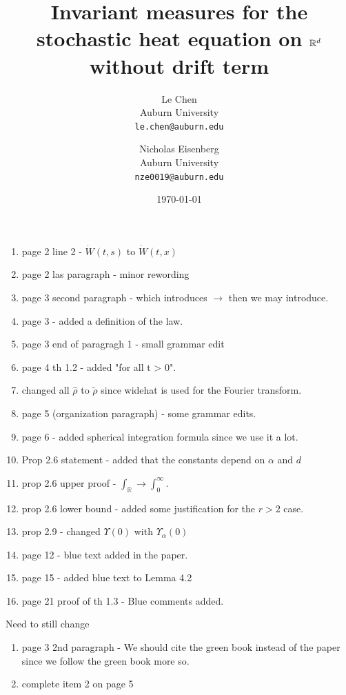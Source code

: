 \documentclass[a4paper,11pt]{article}%
\title{Invariant measures for the stochastic heat equation on $\R^d$ without drift term}
\author{Le Chen\\Auburn University\\\texttt{le.chen@auburn.edu}\\
  \and
    Nicholas Eisenberg\\Auburn University\\\texttt{nze0019@auburn.edu}
  }
\date{\today}
\theoremstyle{plain}
\theoremstyle{definition}
\numberwithin{equation}{section}
\newcommand{\R}{\mathbb{R}}
\begin{document}
	\begin{enumerate}
		\item page 2 line 2 - $\dot{W}(t,s)$ to $\dot{W}(t,x)$
		\item page 2 las paragraph - minor rewording 
		\item page 3 second paragraph - which introduces $\to$ then we may introduce.
		\item page 3 - added a definition of the law.
		\item page 3 end of paragragh 1 - small grammar edit
		\item page 4 th 1.2 - added "for all t > 0".
    	\item changed all $\widehat{\rho}$ to $\tilde\rho$ since widehat is used for the Fourier transform.
    	\item page 5 (organization paragraph) - some grammar edits.
    	\item page 6 - added spherical integration formula since we use it a lot. 
    	\item Prop 2.6 statement - added that the constants depend on $\alpha$ and $d$
    	\item prop 2.6 upper proof - $\int_{\R} \to \int_0^{\infty}$. 
    	\item prop 2.6 lower bound - added some justification for the $r > 2$ case. 
    	\item prop 2.9 - changed $\Upsilon(0)$ with $\Upsilon_{\alpha}(0)$
    	\item page 12 - blue text added in the paper.
    	\item page 15 - added blue text to Lemma 4.2
    	\item page 21 proof of th 1.3 - Blue comments added. 
	\end{enumerate}

Need to still change
\begin{enumerate}
	\item page 3 2nd paragraph - We should cite the green book instead of the paper since we follow the green book more so. 
	\item complete item 2 on page 5
\end{enumerate}
\end{document}

